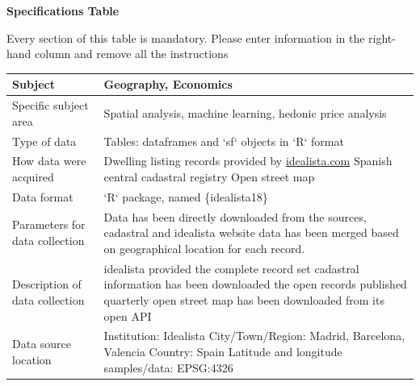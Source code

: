\documentclass[times,final]{elsarticle}
\begin{document}

{\fontsize{7.5pt}{9pt}\selectfont
\noindent\textbf{Specifications Table}

Every section of this table is mandatory.
Please enter information in the right-hand column and remove all the instructions
\begin{longtable}{|p{33mm}|p{94mm}|}
\hline
\endhead
\hline
\endfoot
Subject                & Geography, Economics\\
\hline
Specific subject area  & Spatial analysis, machine learning, hedonic price analysis\\
\hline
Type of data           & Tables: dataframes and `sf` objects in `R` format\newline\\
How data were acquired & Dwelling listing records provided by \url{idealista.com} \cite{idealista}\newline
                         Spanish central cadastral registry \cite{Catastro}\newline
                         Open street map \cite{OpenStreetMap}\newline
\\
\hline
Data format            & `R` package, named \{idealista18\}\\
\hline
Parameters for
data\newline
collection             & Data has been directly downloaded from the sources, cadastral and idealista website data has been merged based on geographical location for each record.
\\

\hline
Description of
data\newline
collection             & idealista provided the complete record set \newline
                         cadastral information has been downloaded the open records published quarterly\newline
                         open street map has been downloaded from its open API
\\
\hline
Data source location   & Institution: Idealista\newline
                         City/Town/Region: Madrid, Barcelona, Valencia\newline
                         Country: Spain\newline
                         Latitude and longitude samples/data: EPSG:4326\newline
\\


\end{longtable}}
\end{document}

